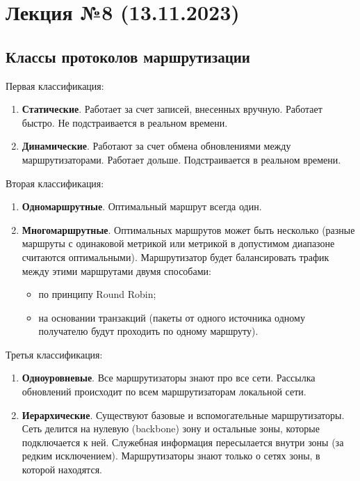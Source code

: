 \section{Лекция №8 (13.11.2023)}

\subsection{Классы протоколов маршрутизации}

Первая классификация:

\begin{enumerate}
    \item \textbf{Статические}. Работает за счет записей, внесенных вручную. Работает быстро. Не подстраивается в реальном времени.
    \item \textbf{Динамические}. Работают за счет обмена обновлениями между маршрутизаторами. Работает дольше. Подстраивается в реальном времени.
\end{enumerate}

Вторая классификация:

\begin{enumerate}
    \item \textbf{Одномаршрутные}. Оптимальный маршрут всегда один.
    \item \textbf{Многомаршрутные}. Оптимальных маршрутов может быть несколько (разные маршруты с одинаковой метрикой или метрикой в допустимом диапазоне считаются оптимальными). Маршрутизатор будет балансировать трафик между этими маршрутами двумя способами:
          \begin{itemize}
              \item по принципу Round Robin;
              \item на основании транзакций (пакеты от одного источника одному получателю будут проходить по одному маршруту).
          \end{itemize}
\end{enumerate}

Третья классификация:

\begin{enumerate}
    \item \textbf{Одноуровневые}. Все маршрутизаторы знают про все сети. Рассылка обновлений происходит по всем маршрутизаторам локальной сети.
    \item \textbf{Иерархические}. Существуют базовые и вспомогательные маршрутизаторы. Сеть делится на нулевую (backbone) зону и остальные зоны, которые подключается к ней. Служебная информация пересылается внутри зоны (за редким исключением). Маршрутизаторы знают только о сетях зоны, в которой находятся.
\end{enumerate}

